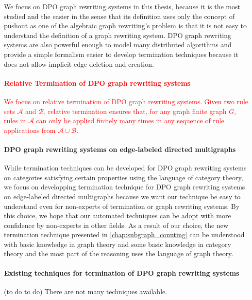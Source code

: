    We focus on DPO graph rewriting systems in this thesis, because it is the most studied and the easier in the sense that its definition uses only the concept of pushout as one of the algebraic graph rewriting's problem is that it is not easy to understand the definition of a graph rewriting system. DPO graph rewriting systems are also powerful enough to model many distributed algorithms and provide a simple formalism easier to develop termination techniques because it does not allow implicit edge deletion and creation.

\textcolor{red}{
    \paragraph{Relative Termination of DPO graph rewriting systems}
    We focus on relative termination of DPO graph rewriting systems. Given two rule sets \( \mathcal{A} \) and \( \mathcal{B} \), relative termination ensures that, for any graph finite graph $G$,
    rules in $\mathcal{A}$ can only be applied finitely many times in any sequence of rule applications from $\mathcal{A} \cup \mathcal{B}$. 
}


\paragraph{DPO graph rewriting systems on edge-labeled directed multigraphs}
 While termination techniques can be developed for DPO graph rewriting systems on categories satisfying certain properties using the language of category theory, we focus on developping termination technique for DPO graph rewriting systems on edge-labeled directed multigraphs because we want our technique be easy to understand even for non-experts of termination or graph rewriting systems. By this choice, we hope that our automated techniques can be adopt with more confidence by non-experts in other fields. As a result of our choice, the new termination technique presented in \autoref{chap:subgraph_counting} can be understood with basic knowledge in graph theory and some basic knowledge in category theory and the most part of the reasoning uses the language of graph theory.

\paragraph{Existing techniques for termination of DPO graph rewriting systems}
(to do to do)
There are not many techniques available.
 
